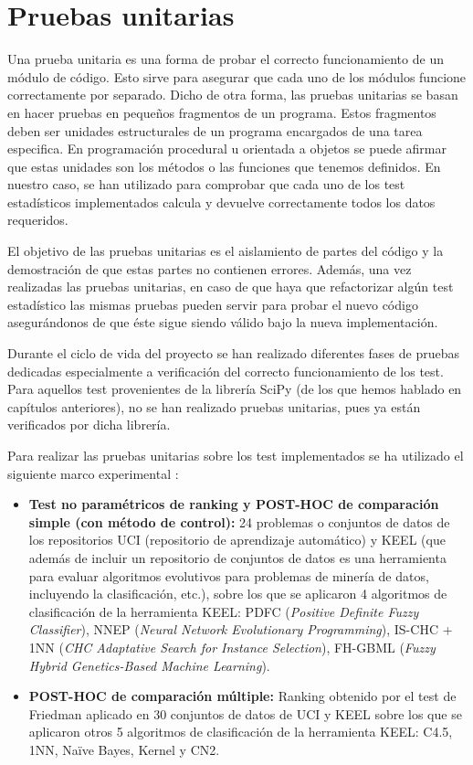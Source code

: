 \section{Pruebas unitarias}
Una prueba unitaria es una forma de probar el correcto funcionamiento de un módulo de código. Esto sirve para asegurar que cada uno de los módulos funcione correctamente por separado. Dicho de otra forma, las pruebas unitarias se basan en hacer pruebas en pequeños fragmentos de un programa. Estos fragmentos deben ser unidades estructurales de un programa encargados de una tarea especifica. En programación procedural u orientada a objetos se puede afirmar que estas unidades son los métodos o las funciones que tenemos definidos. En nuestro caso, se han utilizado para comprobar que cada uno de los test estadísticos implementados calcula y devuelve correctamente todos los datos requeridos.

El objetivo de las pruebas unitarias es el aislamiento de partes del código y la demostración de que estas partes no contienen errores. Además, una vez realizadas las pruebas unitarias, en caso de que haya que refactorizar algún test estadístico las mismas pruebas pueden servir para probar el nuevo código asegurándonos de que éste sigue siendo válido bajo la nueva implementación.

Durante el ciclo de vida del proyecto se han realizado diferentes fases de pruebas dedicadas especialmente a verificación del correcto funcionamiento de los test. Para aquellos test provenientes de la librería SciPy (de los que hemos hablado en capítulos anteriores), no se han realizado pruebas unitarias, pues ya están verificados por dicha librería.

Para realizar las pruebas unitarias sobre los test implementados se ha utilizado el siguiente marco experimental \cite{potencia}:
\begin{itemize}
\item \textbf{Test no paramétricos de ranking y POST-HOC de comparación simple (con método de control):} 24 problemas o conjuntos de datos de los repositorios UCI \cite{uci} (repositorio de aprendizaje automático) y KEEL \cite{keel} (que además de incluir un repositorio de conjuntos de datos es una herramienta para evaluar algoritmos evolutivos para problemas de minería de datos, incluyendo la clasificación, etc.), sobre los que se aplicaron 4 algoritmos de clasificación de la herramienta KEEL: PDFC (\textit{Positive Definite Fuzzy Classifier}), NNEP (\textit{Neural Network Evolutionary Programming}), IS-CHC + 1NN (\textit{CHC Adaptative Search for Instance Selection}), FH-GBML (\textit{Fuzzy Hybrid Genetics-Based Machine Learning}).
\item \textbf{POST-HOC de comparación múltiple:} Ranking obtenido por el test de Friedman aplicado en 30 conjuntos de datos de UCI y KEEL sobre los que se aplicaron otros 5 algoritmos de clasificación de la herramienta KEEL: C4.5, 1NN, Naïve Bayes, Kernel y CN2.
\end{itemize}

